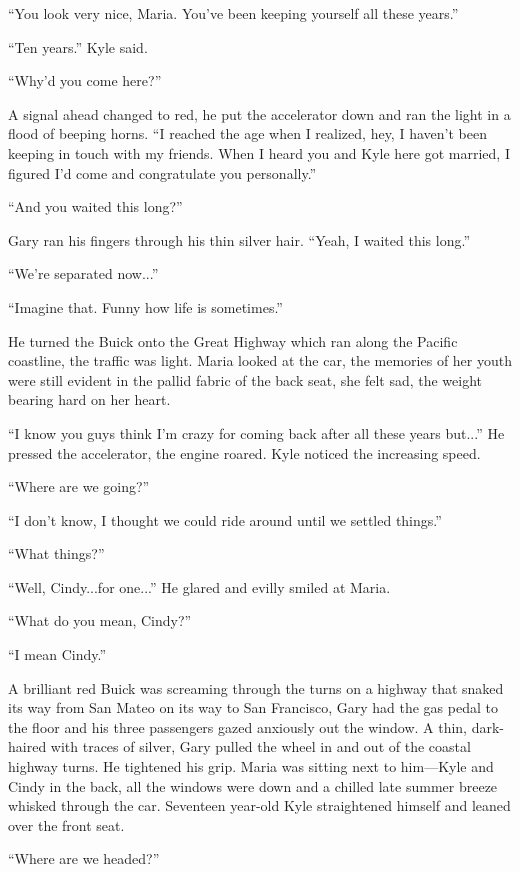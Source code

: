 ``You look very nice, Maria. You've been keeping yourself all these
years.''

``Ten years.'' Kyle said.

``Why'd you come here?''

A signal ahead changed to red, he put the accelerator down and ran the
light in a flood of beeping horns. ``I reached the age when I realized,
hey, I haven't been keeping in touch with my friends. When I heard you
and Kyle here got married, I figured I'd come and congratulate you
personally.''

``And you waited this long?''

Gary ran his fingers through his thin silver hair. ``Yeah, I waited this
long.''

``We're separated now...''

``Imagine that. Funny how life is sometimes.''

He turned the Buick onto the Great Highway which ran along the Pacific
coastline, the traffic was light. Maria looked at the car, the memories
of her youth were still evident in the pallid fabric of the back seat,
she felt sad, the weight bearing hard on her heart.

``I know you guys think I'm crazy for coming back after all these years
but...'' He pressed the accelerator, the engine roared. Kyle noticed the
increasing speed.

``Where are we going?''

``I don't know, I thought we could ride around until we settled
things.''

``What things?''

``Well, Cindy...for one...'' He glared and evilly smiled at Maria.

``What do you mean, Cindy?''

``I mean Cindy.''

A brilliant red Buick was screaming through the turns on a highway that
snaked its way from San Mateo on its way to San Francisco, Gary had the
gas pedal to the floor and his three passengers gazed anxiously out the
window. A thin, dark-haired with traces of silver, Gary pulled the wheel
in and out of the coastal highway turns. He tightened his grip. Maria
was sitting next to him---Kyle and Cindy in the back, all the windows
were down and a chilled late summer breeze whisked through the car.
Seventeen year-old Kyle straightened himself and leaned over the front
seat.

``Where are we headed?''

